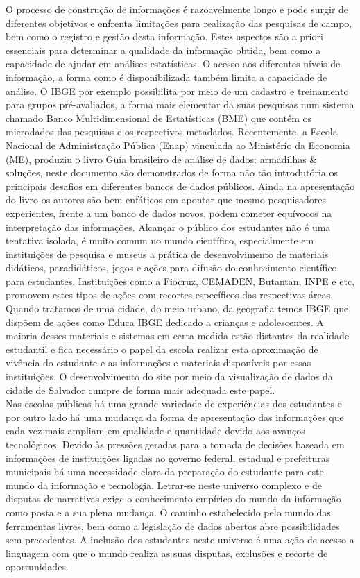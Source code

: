 \documentclass[
]{book}
\begin{document}
O processo de construção de informações é razoavelmente longo e pode surgir de diferentes objetivos e enfrenta limitações para realização das pesquisas de campo, bem como o registro e gestão desta informação. Estes aspectos são a priori essenciais para determinar a qualidade da informação obtida, bem como a capacidade de ajudar em análises estatísticas. O acesso aos diferentes níveis de informação, a forma como é disponibilizada também limita a capacidade de análise. O IBGE por exemplo possibilita por meio de um cadastro e treinamento para grupos pré-avaliados, a forma mais elementar da suas pesquisas num sistema chamado Banco Multidimensional de Estatísticas (BME) que contém os microdados das pesquisas e os respectivos metadados. Recentemente, a Escola Nacional de Administração Pública (Enap) vinculada ao Ministério da Economia (ME), produziu o livro Guia brasileiro de análise de dados: armadilhas \& soluções, neste documento são demonstrados de forma não tão introdutória os principais desafios em diferentes bancos de dados públicos. Ainda na apresentação do livro os autores são bem enfáticos em apontar que mesmo pesquisadores experientes, frente a um banco de dados novos, podem cometer equívocos na interpretação das informações. Alcançar o público dos estudantes não é uma tentativa isolada, é muito comum no mundo científico, especialmente em instituições de pesquisa e museus a prática de desenvolvimento de materiais didáticos, paradidáticos, jogos e ações para difusão do conhecimento científico para estudantes. Instituições como a Fiocruz, CEMADEN, Butantan, INPE e etc, promovem estes tipos de ações com recortes específicos das respectivas áreas. Quando tratamos de uma cidade, do meio urbano, da geografia temos IBGE que dispõem de ações como Educa IBGE dedicado a crianças e adolescentes. A maioria desses materiais e sistemas em certa medida estão distantes da realidade estudantil e fica necessário o papel da escola realizar esta aproximação de vivência do estudante e as informações e materiais disponíveis por essas instituições. O desenvolvimento do site por meio da visualização de dados da cidade de Salvador cumpre de forma mais adequada este papel.\\
Nas escolas públicas há uma grande variedade de experiências dos estudantes e por outro lado há uma mudança da forma de apresentação das informações que cada vez mais ampliam em qualidade e quantidade devido aos avanços tecnológicos. Devido às pressões geradas para a tomada de decisões baseada em informações de instituições ligadas ao governo federal, estadual e prefeituras municipais há uma necessidade clara da preparação do estudante para este mundo da informação e tecnologia. Letrar-se neste universo complexo e de disputas de narrativas exige o conhecimento empírico do mundo da informação como posta e a sua plena mudança. O caminho estabelecido pelo mundo das ferramentas livres, bem como a legislação de dados abertos abre possibilidades sem precedentes. A inclusão dos estudantes neste universo é uma ação de acesso a linguagem com que o mundo realiza as suas disputas, exclusões e recorte de oportunidades.\\
\end{document}
